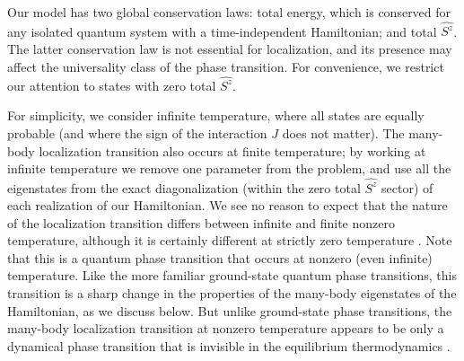 \documentclass[letterpaper, twocolumn,superscriptaddress, showpacs,preprintnumbers,amsmath,amssymb]{revtex4}
\begin{document}
Our model has two global conservation laws: total energy, which is conserved for any isolated quantum system with a time-independent Hamiltonian;
and total $\hat{S^z}$. The latter conservation law is not essential for localization,
and its presence may affect the universality class of the phase transition.
For convenience, we restrict our attention to states with zero total $\hat{S^z}$.

For simplicity, we consider infinite temperature, where all states are equally probable
(and where the sign of the interaction $J$ does not matter).
The many-body localization transition also occurs at finite temperature;
by working at infinite temperature we remove one parameter from the problem, and use all the eigenstates from
the exact diagonalization (within the zero total $\hat{S^z}$ sector) of each realization of our Hamiltonian.
We see no reason to expect that the nature of the localization transition differs between infinite and finite nonzero temperature,
although it is certainly different at strictly zero temperature \cite{gs}. %
Note that this is a quantum phase transition that occurs at nonzero (even infinite) temperature.
Like the more familiar ground-state quantum phase transitions,
this transition is a sharp change in the properties of the many-body eigenstates of the Hamiltonian,
as we discuss below.  But unlike ground-state phase transitions,
the many-body localization transition at nonzero temperature appears to be only a dynamical phase transition
that is invisible in the equilibrium thermodynamics \cite{OHED}.
\end{document}
